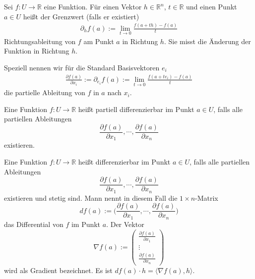 \begin{Definition}[Richtungsableitung]
Sei $f: U \to \mathbb{R}$ eine Funktion. Für einen Vektor $h \in  \mathbb{R}^n$, $t \in \mathbb{R}$  und einen Punkt  $a \in U$ heißt der Grenzwert (falls er existiert) 
\begin{align*}
\partial_h f(a) := \lim_{t \to 0} \frac{f(a + th) - f(a)}{t}
\end{align*}
Richtungsableitung von $f$ am Punkt $a$ in Richtung $h$. Sie misst die Änderung der Funktion in Richtung $h$.

Speziell nennen wir für die Standard Basisvektoren $e_i$ 
\begin{align*}
\frac{\partial f(a)}{\partial x_i}  := \partial_{e_i} f(a) := \lim_{t \to 0} \frac{f(a + t e_i) - f(a)}{t}
\end{align*}
die partielle Ableitung von $f$ in $a$ nach $x_i$.
\end{Definition}

\begin{Definition}
Eine Funktion  $f: U \to \mathbb{R}$ heißt partiell differenzierbar im Punkt $a \in U$, falls alle partiellen Ableitungen 
$$\frac{\partial f(a)}{\partial x_1}, \cdots , \frac{\partial f(a)}{\partial x_n}$$ 
existieren.
\end{Definition}

\begin{Definition}[Differenzierbarkeit]
\label{diffbarkeit}
Eine Funktion $f: U \to \mathbb{R}$ heißt  differenzierbar im Punkt $a \in U$, falls alle partiellen Ableitungen 
$$\frac{\partial f(a)}{\partial x_1}, \cdots, \frac{\partial f(a)}{\partial x_n}$$
 existieren und stetig sind.  Mann nennt  in diesem Fall die $1 \times n$-Matrix 
$$df(a) := \biggl( \frac{\partial f(a)}{\partial x_1}, \cdots, \frac{\partial f(a)}{\partial x_n} \biggr)$$
das Differential von $f$ im Punkt $a$. Der Vektor 
$$\nabla f (a) := \begin{pmatrix}  \frac{\partial f(a)}{\partial x_1} \\  \vdots \\ \frac{\partial f(a)}{\partial x_n}  \end{pmatrix}$$
wird als Gradient bezeichnet. Es ist $df(a) \cdot h = \langle \nabla f (a) , h \rangle$.
\end{Definition}


